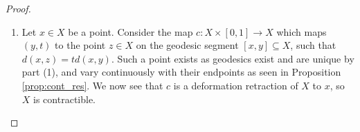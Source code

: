\documentclass[11pt, a4paper, oneside]{memoir}
\theoremstyle{plain}\newtheorem{theorem}[subsection]{Theorem}
\theoremstyle{definition}
\begin{document}
\begin{proof}
\begin{enumerate}
Next we show that \(S\) is open.
Let \(t\in S\).
As \(\sigma\) is a local geodesic, there exists a neighborhood \([t-\varepsilon,t+\varepsilon]\) of \(t\), with \(\varepsilon>0\), such that \(\sigma|_{[t-\varepsilon,t+\varepsilon]}\) is a geodesic.
Let \(t-\varepsilon<p<t<q<t+\varepsilon\), and consider the geodesic triangle \(\Delta([\sigma(a),\sigma(t)],[\sigma(t),\sigma(q)],[\sigma(q),\sigma(a)])\).
We claim that the comparison triangle \(\overline{\Delta}\) is degenerate.
Assume not.
Then
\begin{align*}
d(\overline{\sigma(p)},\overline{\sigma(t)})+d(\overline{\sigma(t)},\overline{\sigma(q)})
    &>d(\overline{\sigma(p)},\overline{\sigma(q)})\tag*{(as non-degenerate)}\\
    &\geq d(\sigma(p),\sigma(q))\tag*{(CAT(0) inequality)}\\
    &=d(\sigma(p),\sigma(t))+d(\sigma(t),\sigma(q))\tag*{(as local geodesic)}\\
    &=d(\overline{\sigma(p)},\overline{\sigma(t)})+d(\overline{\sigma(t)},\overline{\sigma(q)})
\end{align*}
which is a contradiction.
\(\overline{\Delta}\) must therefore be degenerate.
This in turn means \(d(\sigma(a),\sigma(t))+d(\sigma(t),\sigma(q))=d(\sigma(a),\sigma(q))\) whereby \(\sigma|_{[a,q]}\) is a geodesic.
In other words, for every \(t\in S\) there exists a \(q>t\) where \(q\in S\), showing that \(S\) is open.
Now \(S\subseteq [a,b]\) is both open and closed.
The only subsets of \([a,b]\) which are both open and closed are the empty set and the entire set, as \([a,b]\) is connected.
As we have seen above, \(S\) is non-empty as \(\sigma\) is a local geodesic, so \(S=[a,b]\) whereby \(\sigma\) is a geodesic.

    \item Let \(x\in X\) be a point. 
Consider the map \(c:X\times [0,1]\to X\) which maps \((y,t)\) to the point \(z\in X\) on the geodesic segment \([x,y]\subseteq X\), such that \(d(x,z)=td(x,y)\).
Such a point exists as geodesics exist and are unique by part (1), and vary continuously with their endpoints as seen in Proposition \ref{prop:cont_res}.
We now see that \(c\) is a deformation retraction of \(X\) to \(x\), so \(X\) is contractible.


\end{enumerate}
\end{proof}
\end{document}
